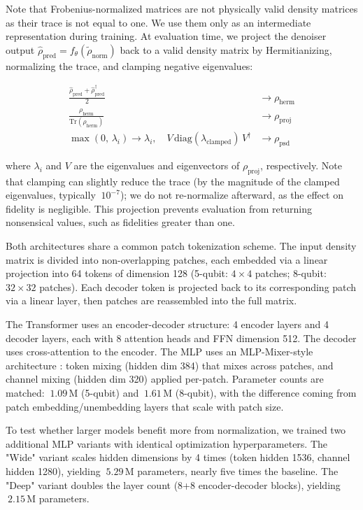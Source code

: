 \documentclass{ieeeqccl}
\begin{document}
\newpage

Note that Frobenius-normalized matrices are not physically valid density matrices as their trace is not equal to one.  We use them only as an intermediate representation during training.  At evaluation time, we project the denoiser output \(\hat{\rho}_{\text{pred}} = f_\theta(\tilde{\rho}_{\text{norm}})\) back to a valid density matrix by Hermitianizing, normalizing the trace, and clamping negative eigenvalues:

\begin{align}
\frac{\hat{\rho}_{\text{pred}} + \hat{\rho}_{\text{pred}}^\dagger}{2} &\rightarrow \rho_{\text{herm}} \\
\frac{\rho_{\text{herm}}}{\mathrm{Tr}(\rho_{\text{herm}})} &\rightarrow \rho_{\text{proj}} \\
\max(0,\, \lambda_i) \rightarrow \lambda_i, \quad V\, \mathrm{diag}(\lambda_{\text{clamped}})\, V^\dagger &\rightarrow \rho_{\text{psd}}
\end{align}

where \(\lambda_i\) and \(V\) are the eigenvalues and eigenvectors of \(\rho_{\text{proj}}\), respectively.  Note that clamping can slightly reduce the trace (by the magnitude of the clamped eigenvalues, typically \(~10^{-7}\)); we do not re-normalize afterward, as the effect on fidelity is negligible.  This projection prevents evaluation from returning nonsensical values, such as fidelities greater than one.

Both architectures share a common patch tokenization scheme.  The input density matrix is divided into non-overlapping patches, each embedded via a linear projection into 64 tokens of dimension 128 (5-qubit: \(4\times 4\) patches; 8-qubit: \(32\times 32\) patches).  Each decoder token is projected back to its corresponding patch via a linear layer, then patches are reassembled into the full matrix.

The Transformer uses an encoder-decoder structure: 4 encoder layers and 4 decoder layers, each with 8 attention heads and FFN dimension 512.  The decoder uses cross-attention to the encoder.  The MLP uses an MLP-Mixer-style architecture \autocite{tolstikhin2021mlpmixer}: token mixing (hidden dim 384) that mixes across patches, and channel mixing (hidden dim 320) applied per-patch.  Parameter counts are matched: \(~1.09\,\mathrm{M}\) (5-qubit) and \(~1.61\,\mathrm{M}\) (8-qubit), with the difference coming from patch embedding/unembedding layers that scale with patch size.

To test whether larger models benefit more from normalization, we trained two additional MLP variants with identical optimization hyperparameters.  The "Wide" variant scales hidden dimensions by 4 times (token hidden 1536, channel hidden 1280), yielding \(~5.29\,\mathrm{M}\) parameters, nearly five times the baseline.  The "Deep" variant doubles the layer count (8+8 encoder-decoder blocks), yielding \(~2.15\,\mathrm{M}\) parameters.
\end{document}
